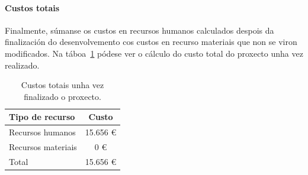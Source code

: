 \paragraph{Custos totais}
Finalmente, súmanse os custos en recursos humanos calculados despois da finalización do desenvolvemento cos custos en recurso materiais que non se viron modificados. Na táboa~\ref{tab:custoTotal} pódese ver o cálculo do custo total do proxecto unha vez realizado.

\begin{table} [tbh]
	\footnotesize
	\centering
	\begin{tabular}{|l|c|}
		\hline 
		\textbf{Tipo de recurso} & \textbf{Custo} \\ 
		\hline 
		Recursos humanos & 15.656 € \\ 
		\hline 
		Recursos materiais & 0 € \\ 
		\hline 
		Total & 15.656 € \\ 
		\hline 
	\end{tabular}
	\caption{Custos totais unha vez finalizado o proxecto.}
	\label{tab:custoTotal}
\end{table}
